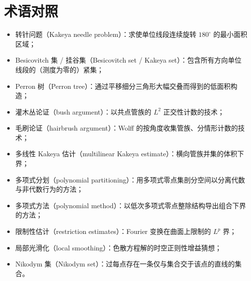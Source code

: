 \section*{术语对照}
\begin{itemize}
    \item 转针问题（Kakeya needle problem）：求使单位线段连续旋转 $180^\circ$ 的最小面积区域；
    \item Besicovitch 集 / 挂谷集（Besicovitch set / Kakeya set）：包含所有方向单位线段的（测度为零的）紧集；
    \item Perron 树（Perron tree）：通过平移细分三角形大幅交叠而得到的低面积构造；
    \item 灌木丛论证（bush argument）：以共点管族的 $L^2$ 正交性计数的技术；
    \item 毛刷论证（hairbrush argument）：Wolff 的按角度收集管族、分情形计数的技术；
    \item 多线性 Kakeya 估计（multilinear Kakeya estimate）：横向管族并集的体积下界；
    \item 多项式分划（polynomial partitioning）：用多项式零点集剖分空间以分离代数与非代数行为的方法；
    \item 多项式方法（polynomial method）：以低次多项式零点整除结构导出组合下界的方法；
    \item 限制性估计（restriction estimates）：Fourier 变换在曲面上限制的 $L^p$ 界；
    \item 局部光滑化（local smoothing）：色散方程解的时空正则性增益猜想；
    \item Nikodym 集（Nikodym set）：过每点存在一条仅与集合交于该点的直线的集合。
\end{itemize}
